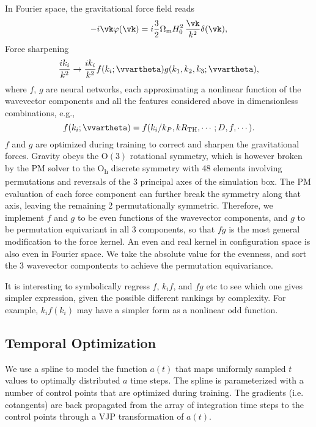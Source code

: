 \documentclass[usenatbib]{mnras}
\newcommand{\Omegam}{\Omega_\mathrm{m}}
\newcommand{\tophat}{\mathrm{TH}}
\newcommand{\YL}[1]{\textcolor{Bittersweet}{#1}}
\begin{document}
In Fourier space, the gravitational force field reads
\begin{equation}
- i \vk \varphi(\vk) = i \frac32 \Omegam H_0^2 \,\frac{\vk}{k^2} \delta(\vk),
\end{equation}
Force sharpening
%
\begin{equation}
\frac{i k_i}{k^2} \to \frac{i k_i}{k^2}
  f(k_i; \vvartheta) g(k_1, k_2, k_3; \vvartheta),
\end{equation}
%
where $f$, $g$ are neural networks, each approximating a nonlinear
function of the wavevector components and all the features considered
above in dimensionless combinations, e.g.,
%
\begin{equation}
f(k_i; \vvartheta) = f(k_i/k_P, kR_\tophat, \cdots; D, f, \cdots).
\end{equation}
%
$f$ and $g$ are optimized during training to correct and sharpen the
gravitational forces.
Gravity obeys the $\mathrm{O}(3)$ rotational symmetry, which is however
broken by the PM solver to the O\textsubscript{h} discrete symmetry with
48 elements involving permutations and reversals of the 3 principal axes
of the simulation box.
The PM evaluation of each force component can further break the symmetry
along that axis, leaving the remaining 2 permutationally symmetric.
Therefore, we implement $f$ and $g$ to be even functions of the
wavevector components, and $g$ to be permutation equivariant in all 3
components, so that $f g$ is the most general modification to the force
kernel.
An even and real kernel in configuration space is also even in Fourier
space.
We take the absolute value for the evenness, and sort the 3 wavevector
compontents to achieve the permutation equivariance.

\YL{It is interesting to symbolically regress $f$, $k_i f$, and $f g$
etc to see which one gives simpler expression, given the possible
different rankings by complexity.
For example, $k_i f(k_i)$ may have a simpler form as a nonlinear odd
function.}


\subsection{Temporal Optimization}
\label{sec:to}

We use a spline to model the function $a(t)$ that maps uniformly sampled $t$
values to optimally distributed $a$ time steps.
The spline is parameterized with a number of control points that are optimized
during training.
The gradients (i.e. cotangents) are back propagated from the array of
integration time steps to the control points through a VJP transformation of
$a(t)$.
\end{document}
